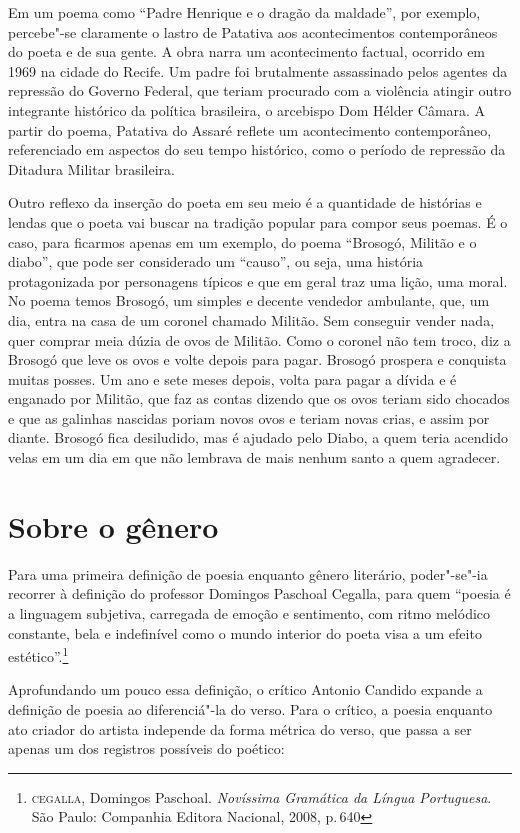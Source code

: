 Em um poema como “Padre Henrique e o dragão da maldade”, por exemplo, percebe"-se claramente o lastro de Patativa aos acontecimentos contemporâneos do poeta e de sua gente. A obra narra um acontecimento factual, ocorrido em 1969 na cidade do Recife. Um padre foi brutalmente
assassinado pelos agentes da repressão do Governo Federal, que teriam
procurado com a violência atingir outro integrante histórico da política
brasileira, o arcebispo Dom Hélder Câmara. A partir do poema, Patativa do Assaré reflete um acontecimento contemporâneo, referenciado em aspectos do seu tempo histórico, como o período de repressão da Ditadura Militar brasileira.

Outro reflexo da inserção do poeta em seu meio é a quantidade de histórias e lendas que
o poeta vai buscar na tradição popular para compor seus poemas.
É o caso, para ficarmos apenas em um exemplo, do poema “Brosogó, Militão e o diabo”, que pode ser considerado um “causo”, ou seja, uma história protagonizada por personagens típicos e que em geral traz uma lição, uma moral.
No poema temos Brosogó, um simples e decente
vendedor ambulante, que, um dia, entra na casa de um coronel chamado Militão. Sem
conseguir vender nada, quer comprar meia dúzia de ovos de Militão. Como o
coronel não tem troco, diz a Brosogó que leve os ovos e volte depois para
pagar. Brosogó prospera e conquista muitas posses. Um ano e sete meses depois,
volta para pagar a dívida e é enganado por Militão, que faz as contas dizendo
que os ovos teriam sido chocados e que as galinhas nascidas poriam novos ovos e
teriam novas crias, e assim por diante. Brosogó fica desiludido, mas é ajudado
pelo Diabo, a quem teria acendido velas em um dia em que não lembrava de mais
nenhum santo a quem agradecer.


\section{Sobre o gênero}

Para uma primeira definição de poesia enquanto gênero literário, poder"-se"-ia recorrer à definição do professor Domingos Paschoal Cegalla, para quem ``poesia é a linguagem subjetiva, carregada de emoção e sentimento, com ritmo melódico constante, bela e indefinível como o mundo interior do poeta visa a um efeito estético''.\footnote{\textsc{cegalla}, Domingos Paschoal. \textit{Novíssima Gramática da Língua Portuguesa}. São Paulo: Companhia Editora Nacional, 2008, p.\,640}

Aprofundando um pouco essa definição, o crítico Antonio Candido expande a definição de poesia ao diferenciá"-la do verso.
Para o crítico, a poesia enquanto ato criador do artista independe da forma métrica do verso, que passa a ser apenas um dos registros possíveis do poético:


